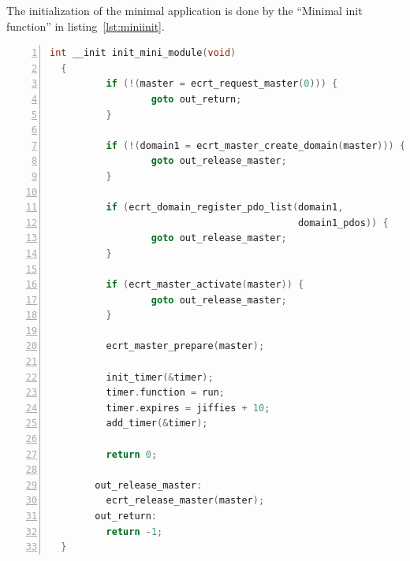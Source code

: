 \documentclass[a4paper,12pt,BCOR6mm,bibtotoc,idxtotoc]{scrbook}
\begin{document}
The initialization of the minimal application is done by the ``Minimal init
function'' in listing~\ref{lst:miniinit}.

\begin{lstlisting}[gobble=2,language=C,numbers=left,caption={Minimal init
    function},label={lst:miniinit}]
  int __init init_mini_module(void)
  {
          if (!(master = ecrt_request_master(0))) {
                  goto out_return;
          }

          if (!(domain1 = ecrt_master_create_domain(master))) {
                  goto out_release_master;
          }

          if (ecrt_domain_register_pdo_list(domain1,
                                            domain1_pdos)) {
                  goto out_release_master;
          }

          if (ecrt_master_activate(master)) {
                  goto out_release_master;
          }

          ecrt_master_prepare(master);

          init_timer(&timer);
          timer.function = run;
          timer.expires = jiffies + 10;
          add_timer(&timer);

          return 0;

        out_release_master:
          ecrt_release_master(master);
        out_return:
          return -1;
  }
\end{lstlisting}
\end{document}
